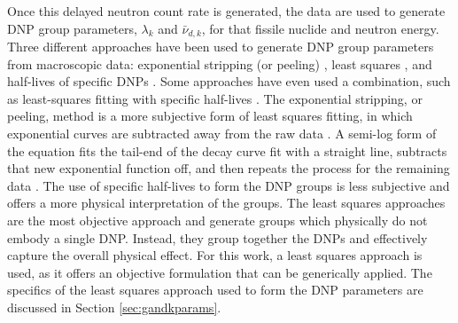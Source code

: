 Once this delayed neutron count rate is generated, the data are used to generate \gls{DNP} group parameters, $\lambda_k$ and $\bar{\nu}_{d, k}$, for that fissile nuclide and neutron energy.
Three different approaches have been used to generate \gls{DNP} group parameters from macroscopic data: exponential stripping (or peeling) \cite{brunson1955measurement, keepin1955delayed}, least squares \cite{brady1988evaluation, keepin1957delayed}, and half-lives of specific \glspl{DNP} \cite{saphier1977evaluated}.
Some approaches have even used a combination, such as least-squares fitting with specific half-lives \cite{spriggs20028}.
The exponential stripping, or peeling, method is a more subjective form of least squares fitting, in which exponential curves are subtracted away from the raw data \cite{price2020review}.
A semi-log form of the equation fits the tail-end of the decay curve fit with a straight line, subtracts that new exponential function off, and then repeats the process for the remaining data \cite{spriggs20028}.
The use of specific half-lives to form the \gls{DNP} groups is less subjective and offers a more physical interpretation of the groups.
The least squares approaches are the most objective approach and generate groups which physically do not embody a single \gls{DNP}.
Instead, they group together the \glspl{DNP} and effectively capture the overall physical effect.
For this work, a least squares approach is used, as it offers an objective formulation that can be generically applied.
The specifics of the least squares approach used to form the \gls{DNP} parameters are discussed in Section \ref{sec:gandkparams}.


